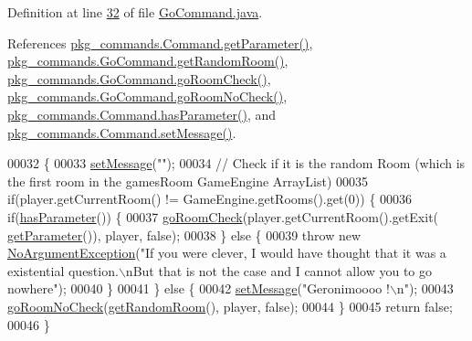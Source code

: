 Definition at line \hyperlink{GoCommand_8java_source_l00032}{32} of file \hyperlink{GoCommand_8java_source}{Go\-Command.\-java}.



References \hyperlink{Command_8java_source_l00041}{pkg\-\_\-commands.\-Command.\-get\-Parameter()}, \hyperlink{GoCommand_8java_source_l00087}{pkg\-\_\-commands.\-Go\-Command.\-get\-Random\-Room()}, \hyperlink{GoCommand_8java_source_l00056}{pkg\-\_\-commands.\-Go\-Command.\-go\-Room\-Check()}, \hyperlink{GoCommand_8java_source_l00071}{pkg\-\_\-commands.\-Go\-Command.\-go\-Room\-No\-Check()}, \hyperlink{Command_8java_source_l00073}{pkg\-\_\-commands.\-Command.\-has\-Parameter()}, and \hyperlink{Command_8java_source_l00089}{pkg\-\_\-commands.\-Command.\-set\-Message()}.


\begin{DoxyCode}
00032                                                                                                            
                              \{
00033         \hyperlink{classpkg__commands_1_1Command_ae210ff216fe908b111ba1c988a963d13}{setMessage}(\textcolor{stringliteral}{""});
00034         \textcolor{comment}{// Check if it is the random Room (which is the first room in the gamesRoom GameEngine ArrayList)}
00035         \textcolor{keywordflow}{if}(player.getCurrentRoom() != GameEngine.getRooms().\textcolor{keyword}{get}(0)) \{
00036             \textcolor{keywordflow}{if}(\hyperlink{classpkg__commands_1_1Command_a02af95ab3f1898a66259ab7c177b6998}{hasParameter}()) \{
00037                 \hyperlink{classpkg__commands_1_1GoCommand_acbf1aa81fa5b1aef7cafb8b4e3ace3a9}{goRoomCheck}(player.getCurrentRoom().getExit(
      \hyperlink{classpkg__commands_1_1Command_a41c92d445be73ea9d62320c65efb8434}{getParameter}()), player, \textcolor{keyword}{false});
00038             \} \textcolor{keywordflow}{else} \{
00039                 \textcolor{keywordflow}{throw} \textcolor{keyword}{new} \hyperlink{classpkg__exceptions_1_1NoArgumentException}{NoArgumentException}(\textcolor{stringliteral}{"If you were clever, I would have thought
       that it was a existential question.\(\backslash\)nBut that is not the case and I cannot allow you to go nowhere"});
00040             \}
00041         \} \textcolor{keywordflow}{else} \{
00042             \hyperlink{classpkg__commands_1_1Command_ae210ff216fe908b111ba1c988a963d13}{setMessage}(\textcolor{stringliteral}{"Geronimoooo !\(\backslash\)n"});
00043             \hyperlink{classpkg__commands_1_1GoCommand_a210afbc5f3ef34d3ad5759d853c8f8c2}{goRoomNoCheck}(\hyperlink{classpkg__commands_1_1GoCommand_ae9ef6c18b0cbd0e0104261bdedf9a9d7}{getRandomRoom}(), player, \textcolor{keyword}{false});
00044         \}
00045         \textcolor{keywordflow}{return} \textcolor{keyword}{false};
00046     \}
\end{DoxyCode}


